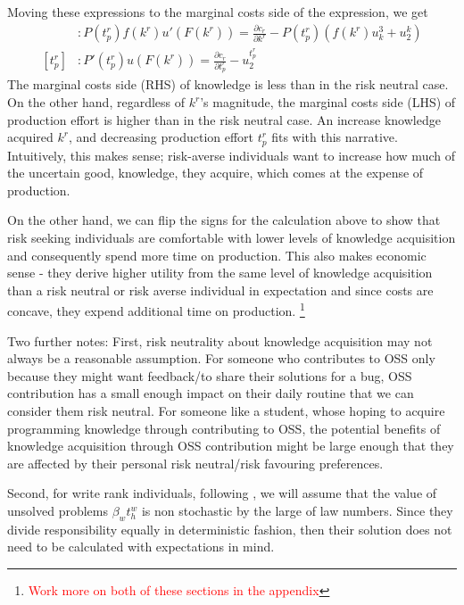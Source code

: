 \documentclass[source/paper/main.tex]{subfiles}
\begin{document}
Moving these expressions to the marginal costs side of the expression, we get
\begin{align*}
    [k^r] &: P(t_p^r)f(k^r)u'(F(k^r)) = \frac{\partial c_r}{\partial k^r} - P(t_p^r)(f(k^r)u_k^3 + u_2^k)\\
    [t_p^r] &: P'(t_p^r) u(F(k^r)) = \frac{\partial c_r}{\partial t_p^r} - u_2^{t_p^r} 
\end{align*}
The marginal costs side (RHS) of knowledge is less than in the risk neutral case. On the other hand, regardless of $k^r$'s magnitude, the marginal costs side (LHS) of production effort is higher than in the risk neutral case. An increase knowledge acquired $k^r$, and decreasing production effort $t_p^r$ fits with this narrative. Intuitively, this makes sense; risk-averse individuals want to increase how much of the uncertain good, knowledge, they acquire, which comes at the expense of production.

On the other hand, we can flip the signs for the calculation above to show that risk seeking individuals are comfortable with lower levels of knowledge acquisition and consequently spend more time on production. This also makes economic sense - they derive higher utility from the same level of knowledge acquisition than a risk neutral or risk averse individual in expectation and since costs are concave, they expend additional time on production. \footnote{\textcolor{red}{Work more on both of these sections in the appendix}}

Two further notes: First, risk neutrality about knowledge acquisition may not always be a reasonable assumption. For someone who contributes to OSS only because they might want feedback/to share their solutions for a bug, OSS contribution has a small enough impact on their daily routine that we can consider them risk neutral. For someone like a student, whose hoping to acquire programming knowledge through contributing to OSS, the potential benefits of knowledge acquisition through OSS contribution might be large enough that they are affected by their personal risk neutral/risk favouring preferences. 

Second, for write rank individuals, following \cite{garicano_hierarchies_2000}, we will assume that the value of unsolved problems $\beta_w t_h^w$ is non stochastic by the large of law numbers. Since they divide responsibility equally in deterministic fashion, then their solution does not need to be calculated with expectations in mind. 
\end{document}
